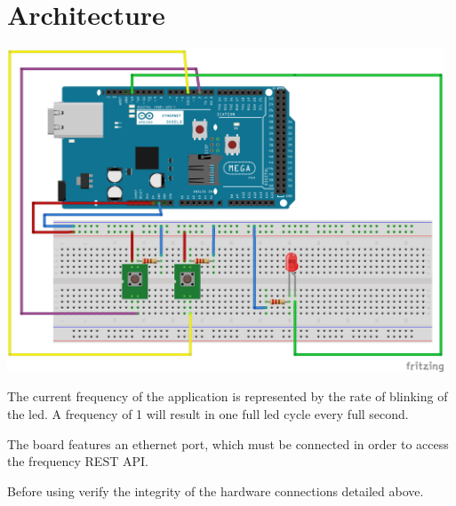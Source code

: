 \chapter{Architecture}

\begin{center}
    \includegraphics[width=13cm]{user_manual.includes/ard_architecture.png}
\end{center}

The current frequency of the application is represented by the rate of blinking of the led. A frequency of 1 will result in one full led cycle every full second.

The board features an ethernet port, which must be connected in order to access the frequency REST API.

Before using verify the integrity of the hardware connections detailed above.
